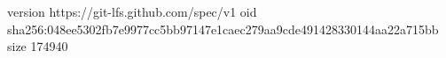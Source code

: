 version https://git-lfs.github.com/spec/v1
oid sha256:048ee5302fb7e9977cc5bb97147e1caec279aa9cde491428330144aa22a715bb
size 174940

